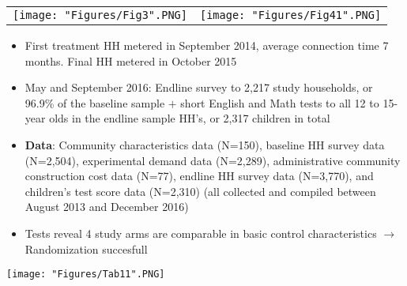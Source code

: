 \documentclass[compress]{beamer}
\begin{document}

\begin{frame}
\begin{adjustbox}{center}
\begin{tabular}{cc}
\texttt{[image: "Figures/Fig3".PNG]} & \texttt{[image: "Figures/Fig41".PNG]} 
\end{tabular}
\end{adjustbox}
\end{frame}

\begin{frame}
\begin{itemize}
\item First treatment HH metered in September 2014, average connection
time 7 months. Final HH metered in October 2015
\item May and September 2016: Endline survey to 2,217 study households, or 96.9\% of the baseline sample $+$ short English and Math tests to all 12 to 15-year olds in the endline sample HH's, or 2,317 children in total
\item \textbf{Data}: Community characteristics data (N=150), baseline HH survey data (N=2,504), experimental demand data (N=2,289), administrative community construction cost data (N=77), endline HH survey data (N=3,770), and children's test score data (N=2,310) (all collected and compiled between August 2013 and December 2016)
\item Tests reveal 4 study arms are comparable in basic control characteristics $\to$ Randomization succesfull
\end{itemize}
\end{frame}

\begin{frame}
\begin{adjustbox}{center}
\texttt{[image: "Figures/Tab11".PNG]} 
\end{adjustbox}
\end{frame}
\end{document}
